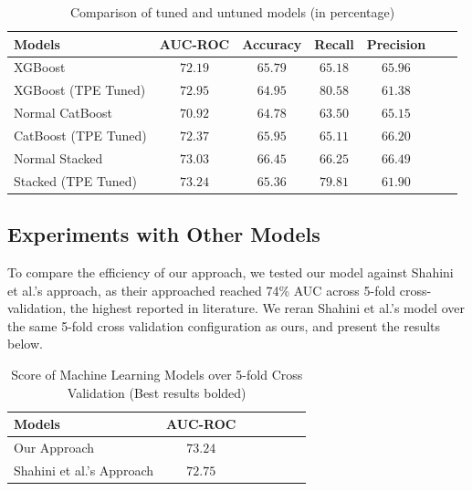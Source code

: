 \documentclass[pdflatex,sn-basic,Numbered]{sn-jnl}%
\theoremstyle{thmstyleone}%
\theoremstyle{thmstyletwo}%
\theoremstyle{thmstylethree}%
\begin{document}
\begin{table}[ht]
\centering
\caption{Comparison of tuned and untuned models (in percentage)}
\label{tab:hypertuning}
\begin{tabular}{@{}lcccccc@{}}
\toprule
 \textbf{Models} & \textbf{AUC-ROC} & \textbf{Accuracy} & \textbf{Recall}  & \textbf{Precision} \\ \midrule
XGBoost & $72.19$ & $65.79$ & $65.18$ & $65.96$ \\ %
 XGBoost (TPE Tuned) & $72.95$ & $64.95$ & $\mathbf{80.58}$ & $61.38$ \\ \hline
Normal CatBoost & $70.92$ & $64.78$ & $63.50$ & $65.15$ \\ %
 CatBoost (TPE Tuned) & $72.37$ & $65.95$ & $65.11$ & $66.20$ \\ \hline
 Normal Stacked & $73.03$ & $\mathbf{66.45}$ & $66.25$ & $\mathbf{66.49}$ \\ %
 Stacked (TPE Tuned) & $\mathbf{73.24}$ & $65.36$ & $79.81$ & $61.90$ \\ \bottomrule %
\end{tabular}%
\vspace{-2ex}
\end{table}

\subsection{Experiments with Other Models}
To compare the efficiency of our approach, we tested our model against Shahini et al.\cite{shahini2019}'s approach, as their approached reached 74\% AUC across 5-fold cross-validation, the highest reported in literature. We reran Shahini et al.\cite{shahini2019}'s model over the same 5-fold cross validation configuration as ours, and present the results below.  

\begin{table}[ht]
\centering
\caption{Score of Machine Learning Models over 5-fold Cross Validation (Best results bolded)}
\label{tab:allaimodels}
\begin{tabular}{@{}lcccccc@{}}
\toprule
 \textbf{Models} & \textbf{AUC-ROC} \\ \midrule
Our Approach & $73.24$ \\
Shahini et al.\cite{shahini2019}'s Approach & $72.75$ \\
 \bottomrule
\end{tabular}%
\vspace{-1ex}
\end{table}
\end{document}
